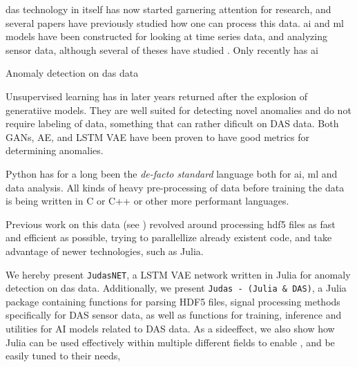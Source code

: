 \acrshort{das} technology in itself has now started garnering attention for research, and several papers have previously studied  how one can process this data. \acrshort{ai} and \acrshort{ml} models have been constructed for looking at time series data, and analyzing sensor data, although several of theses have studied .  Only recently has \acrshort{ai}

Anomaly detection on \acrshort{das} data 

Unsupervised learning has in later years returned after the explosion of generatiive models. They are well suited for detecting novel anomalies \cite{wei2022lstmautoencoder} \cite{srivastava2016unsupervised} and do not require labeling of data, something that can rather dificult on DAS data. Both GANs, AE, and LSTM VAE have been proven to have good metrics for determining anomalies. 


Python has for a long been the \textit{de-facto standard} language both for \acrshort{ai}, \acrshort{ml} and data analysis. All kinds of heavy pre-processing of data before training the data is being written in C or C++ or other more performant languages.    




Previous work on this data (see \cite{projthesis}) revolved around processing \acrshort{hdf5} files as fast and efficient as possible, trying to parallellize already existent code, and take advantage of newer technologies, such as Julia.



We hereby present \texttt{JudasNET}, a LSTM VAE network written in Julia for anomaly detection on \acrshort{das} data. Additionally, we present \texttt{Judas - (Julia \& DAS)}, a Julia package containing functions for parsing HDF5 files, signal processing methods specifically for DAS sensor data, as well as functions for training, inference and utilities for AI models related to DAS data. As a sideeffect, we also show how Julia can be used effectively within multiple different fields to enable , and be easily tuned to their needs,